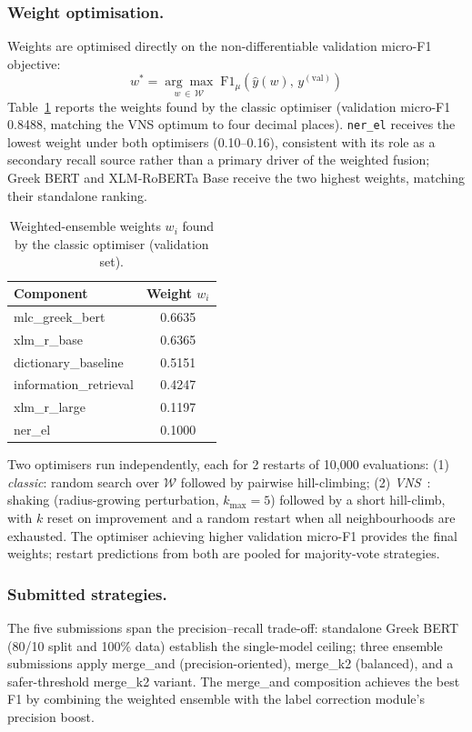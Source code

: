 \subsubsection{Weight optimisation.}
Weights are optimised directly on the non-differentiable validation micro-F1 objective:
\begin{equation}
w^{*} = \underset{w\,\in\,\mathcal{W}}{\arg\max}\; \text{F1}_{\mu}\!\left(\hat{y}(w),\,y^{(\text{val})}\right)
\end{equation}
Table~\ref{tab:weights} reports the weights found by the classic optimiser (validation
micro-F1 0.8488, matching the VNS optimum to four decimal places). \texttt{ner\_el}
receives the lowest weight under both optimisers (0.10--0.16), consistent with its
role as a secondary recall source rather than a primary driver of the weighted fusion;
Greek BERT and XLM-RoBERTa Base receive the two highest weights, matching their
standalone ranking.

\begin{table}[h]
\centering
\caption{Weighted-ensemble weights $w_i$ found by the classic optimiser (validation set).}
\label{tab:weights}
\begin{tabular}{lc}
\toprule
Component & Weight $w_i$ \\
\midrule
mlc\_greek\_bert         & 0.6635 \\
xlm\_r\_base              & 0.6365 \\
dictionary\_baseline      & 0.5151 \\
information\_retrieval    & 0.4247 \\
xlm\_r\_large             & 0.1197 \\
ner\_el                   & 0.1000 \\
\bottomrule
\end{tabular}
\end{table}

Two optimisers run independently, each for 2 restarts of 10,000 evaluations:
(1) \textit{classic}: random search over $\mathcal{W}$ followed by pairwise hill-climbing;
(2) \textit{VNS}~\cite{mladenovic1997variable}: shaking (radius-growing perturbation,
$k_{\max}{=}5$) followed by a short hill-climb, with $k$ reset on improvement and a
random restart when all neighbourhoods are exhausted.
The optimiser achieving higher validation micro-F1 provides the final weights;
restart predictions from both are pooled for majority-vote strategies.

\subsubsection{Submitted strategies.}
The five submissions span the precision--recall trade-off: standalone Greek BERT
(80/10 split and 100\% data) establish the single-model ceiling; three ensemble
submissions apply merge\_and (precision-oriented), merge\_k2 (balanced), and a
safer-threshold merge\_k2 variant. The merge\_and composition achieves the best F1
by combining the weighted ensemble with the label correction module's precision boost.
